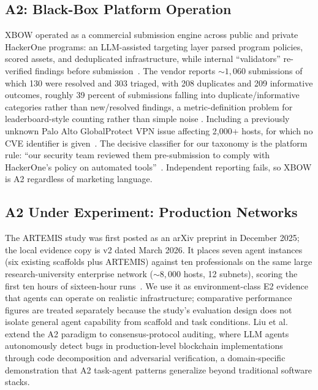 \documentclass[conference,compsoc]{IEEEtran}
\begin{document}
\subsection{A2: Black-Box Platform Operation}
XBOW operated as a commercial submission engine across public and private HackerOne programs:
an LLM-assisted targeting layer parsed program policies, scored assets, and deduplicated
infrastructure, while internal ``validators'' re-verified findings before
submission~\cite{xbowtop12025}. The vendor reports ${\sim}1{,}060$ submissions of which 130
were resolved and 303 triaged, with 208 duplicates and 209 informative outcomes, roughly 39
percent of submissions falling into duplicate/informative categories rather than new/resolved
findings, a metric-definition problem for leaderboard-style counting rather than simple noise
. Including a previously unknown Palo Alto GlobalProtect VPN issue affecting 2{,}000+ hosts,
for which no CVE identifier is given~\cite{xbowtop12025}. The decisive classifier for our
taxonomy is the platform rule: ``our security team reviewed them pre-submission to comply with
HackerOne's policy on automated tools''~\cite{xbowtop12025}. Independent reporting fails,
so XBOW is A2 regardless of marketing language.

\subsection{A2 Under Experiment: Production Networks}
The ARTEMIS study was first posted as an arXiv preprint in December 2025; the local evidence
copy is v2 dated March 2026. It places seven agent instances (six existing scaffolds plus ARTEMIS) against ten professionals on the same
large research-university enterprise network (${\sim}8{,}000$ hosts, 12 subnets), scoring the
first ten hours of sixteen-hour runs~\cite{artemis2025}. We use it as environment-class E2
evidence that agents can operate on realistic infrastructure; comparative performance figures
are treated separately because the study's evaluation design does not isolate general agent
capability from scaffold and task conditions. Liu et al.~\cite{agora2026} extend the A2
paradigm to consensus-protocol auditing, where LLM agents autonomously detect bugs in
production-level blockchain implementations through code decomposition and adversarial
verification, a domain-specific demonstration that A2 task-agent patterns generalize beyond
traditional software stacks.
\end{document}
